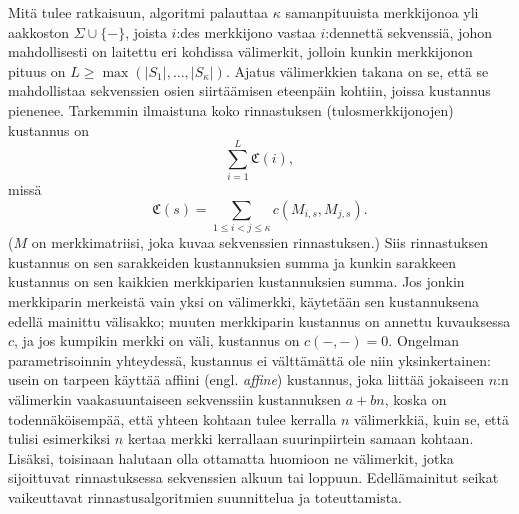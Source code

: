 \documentclass[finnish]{tktltiki2}
\theoremstyle{definition}
\theoremstyle{remark}
\begin{document}
Mitä tulee ratkaisuun, algoritmi palauttaa $\kappa$ samanpituuista merkkijonoa yli aakkoston $\Sigma \cup \{ - \}$, joista $i$:des merkkijono vastaa $i$:dennettä sekvenssiä, johon mahdollisesti on laitettu eri kohdissa välimerkit, jolloin kunkin merkkijonon pituus on $L \geq \max(|S_1|, \dots, |S_\kappa|)$. Ajatus välimerkkien takana on se, että se mahdollistaa sekvenssien osien siirtäämisen eteenpäin kohtiin, joissa kustannus pienenee. Tarkemmin ilmaistuna koko rinnastuksen (tulosmerkkijonojen) kustannus on
\[
\sum_{i = 1}^L \mathfrak{C}(i),
\]
missä 
\[
\mathfrak{C}(s) = \sum_{1 \leq i < j \leq \kappa} c(M_{i, s}, M_{j, s}).
\]
($M$ on merkkimatriisi, joka kuvaa sekvenssien rinnastuksen.) Siis rinnastuksen kustannus on sen sarakkeiden kustannuksien summa ja kunkin sarakkeen kustannus on sen kaikkien merkkiparien kustannuksien summa. Jos jonkin merkkiparin merkeistä vain yksi on välimerkki, käytetään sen kustannuksena edellä mainittu välisakko; muuten merkkiparin kustannus on annettu kuvauksessa $c$, ja jos kumpikin merkki on väli, kustannus on $c(-,-) = 0$. Ongelman parametrisoinnin yhteydessä, kustannus ei välttämättä ole niin yksinkertainen: usein on tarpeen käyttää affiini (engl. \textit{affine}) kustannus, joka liittää jokaiseen $n$:n välimerkin vaakasuuntaiseen sekvenssiin  kustannuksen $a + bn$, koska on todennäköisempää, että yhteen kohtaan tulee kerralla $n$ välimerkkiä, kuin se, että tulisi esimerkiksi $n$ kertaa merkki kerrallaan suurinpiirtein samaan kohtaan. Lisäksi, toisinaan halutaan olla ottamatta huomioon ne välimerkit, jotka sijoittuvat rinnastuksessa sekvenssien alkuun tai loppuun. Edellämainitut seikat vaikeuttavat rinnastusalgoritmien suunnittelua ja toteuttamista.
 
\end{document}

